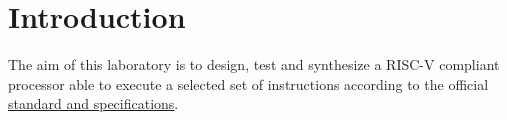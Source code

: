 \chapter{Introduction}
The aim of this laboratory is to design, test and synthesize a RISC-V compliant processor able to execute a selected
set of instructions according to the official \href{https://riscv.org/specifications/}{standard and specifications}.


